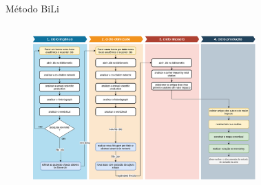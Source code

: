 \begin{frame}{Método BiLi}
	\begin{columns}
        \begin{figure}[!hb]
            \includegraphics[width=1\textwidth]{figures/bili.png}
        \end{figure}
		\begin{figure}[hb] 

\end{figure}
\end{columns}
\end{frame}
